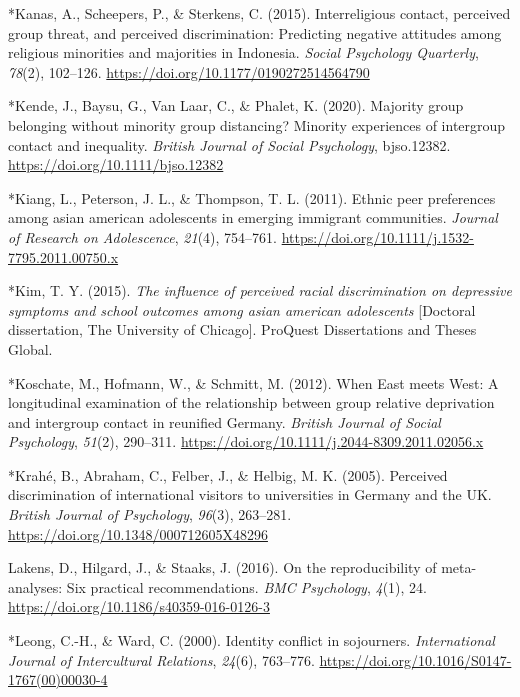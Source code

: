 \documentclass[12pt, letterpaper]{article}
\begin{document}
\leavevmode\hypertarget{ref-1411}{}%
*Kanas, A., Scheepers, P., \& Sterkens, C. (2015). Interreligious
contact, perceived group threat, and perceived discrimination:
Predicting negative attitudes among religious minorities and majorities
in Indonesia. \emph{Social Psychology Quarterly}, \emph{78}(2),
102--126. \url{https://doi.org/10.1177/0190272514564790}

\leavevmode\hypertarget{ref-4002}{}%
*Kende, J., Baysu, G., Van Laar, C., \& Phalet, K. (2020). Majority
group belonging without minority group distancing? Minority experiences
of intergroup contact and inequality. \emph{British Journal of Social
Psychology}, bjso.12382. \url{https://doi.org/10.1111/bjso.12382}

\leavevmode\hypertarget{ref-1525}{}%
*Kiang, L., Peterson, J. L., \& Thompson, T. L. (2011). Ethnic peer
preferences among asian american adolescents in emerging immigrant
communities. \emph{Journal of Research on Adolescence}, \emph{21}(4),
754--761. \url{https://doi.org/10.1111/j.1532-7795.2011.00750.x}

\leavevmode\hypertarget{ref-830}{}%
*Kim, T. Y. (2015). \emph{The influence of perceived racial
discrimination on depressive symptoms and school outcomes among asian
american adolescents} {[}Doctoral dissertation, The University of
Chicago{]}. ProQuest Dissertations and Theses Global.

\leavevmode\hypertarget{ref-401}{}%
*Koschate, M., Hofmann, W., \& Schmitt, M. (2012). When East meets West:
A longitudinal examination of the relationship between group relative
deprivation and intergroup contact in reunified Germany. \emph{British
Journal of Social Psychology}, \emph{51}(2), 290--311.
\url{https://doi.org/10.1111/j.2044-8309.2011.02056.x}

\leavevmode\hypertarget{ref-45}{}%
*Krahé, B., Abraham, C., Felber, J., \& Helbig, M. K. (2005). Perceived
discrimination of international visitors to universities in Germany and
the UK. \emph{British Journal of Psychology}, \emph{96}(3), 263--281.
\url{https://doi.org/10.1348/000712605X48296}

\leavevmode\hypertarget{ref-lakens_reproducibility_2016}{}%
Lakens, D., Hilgard, J., \& Staaks, J. (2016). On the reproducibility of
meta-analyses: Six practical recommendations. \emph{BMC Psychology},
\emph{4}(1), 24. \url{https://doi.org/10.1186/s40359-016-0126-3}

\leavevmode\hypertarget{ref-1993}{}%
*Leong, C.-H., \& Ward, C. (2000). Identity conflict in sojourners.
\emph{International Journal of Intercultural Relations}, \emph{24}(6),
763--776. \url{https://doi.org/10.1016/S0147-1767(00)00030-4}
\end{document}
